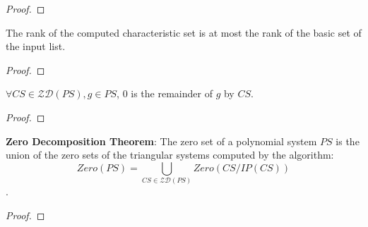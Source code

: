 \begin{proof}
    \leanok
\end{proof}

\begin{theorem}
    \label{thm:characteristicSet_le_basicSet}
    \leanok
    The rank of the computed characteristic set is at most the rank of the basic set of the input list.
\end{theorem}

\begin{proof}
    \leanok
\end{proof}

\begin{theorem}
    \label{thm:zero_isSetRemainder_of_mem_zeroDecomposition}
    \leanok
    $\forall CS \in \mathcal{ZD}(PS), g \in PS$, $0$ is the remainder of $g$ by $CS$.
\end{theorem}

\begin{proof}
    \leanok
\end{proof}

\begin{theorem}
    \label{thm:vanishingSet_eq_zeroDecomposition_union}
    \leanok
    \textbf{Zero Decomposition Theorem}:
    The zero set of a polynomial system $PS$ is the union of the zero sets of the triangular systems computed by the algorithm:
    $$ Zero(PS) = \bigcup_{CS \in \mathcal{ZD}(PS)} Zero(CS/IP(CS)) $$.
\end{theorem}

\begin{proof}
    \leanok
\end{proof}

